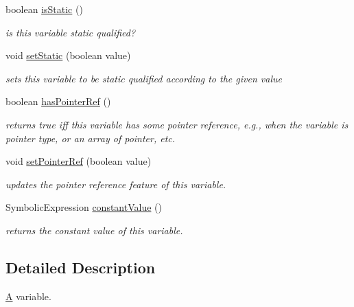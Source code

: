 \begin{DoxyCompactItemize}
\item 
boolean \hyperlink{classedu_1_1udel_1_1cis_1_1vsl_1_1civl_1_1model_1_1common_1_1variable_1_1CommonVariable_ad3a6d561da0a9495e1011d70c77f27e5}{is\+Static} ()
\begin{DoxyCompactList}\small\item\em is this variable static qualified? \end{DoxyCompactList}\item 
void \hyperlink{classedu_1_1udel_1_1cis_1_1vsl_1_1civl_1_1model_1_1common_1_1variable_1_1CommonVariable_abe64d32829988557556abd4056c67526}{set\+Static} (boolean value)
\begin{DoxyCompactList}\small\item\em sets this variable to be static qualified according to the given value \end{DoxyCompactList}\item 
boolean \hyperlink{classedu_1_1udel_1_1cis_1_1vsl_1_1civl_1_1model_1_1common_1_1variable_1_1CommonVariable_a679905d70f87153c5376c6c07711ebaa}{has\+Pointer\+Ref} ()
\begin{DoxyCompactList}\small\item\em returns true iff this variable has some pointer reference, e.\+g., when the variable is pointer type, or an array of pointer, etc. \end{DoxyCompactList}\item 
void \hyperlink{classedu_1_1udel_1_1cis_1_1vsl_1_1civl_1_1model_1_1common_1_1variable_1_1CommonVariable_abd97f2eae43fb74595a83cd7b63382e8}{set\+Pointer\+Ref} (boolean value)
\begin{DoxyCompactList}\small\item\em updates the pointer reference feature of this variable. \end{DoxyCompactList}\item 
Symbolic\+Expression \hyperlink{classedu_1_1udel_1_1cis_1_1vsl_1_1civl_1_1model_1_1common_1_1variable_1_1CommonVariable_adc804a186ec0c828386ac90a1d783159}{constant\+Value} ()
\begin{DoxyCompactList}\small\item\em returns the constant value of this variable. \end{DoxyCompactList}\end{DoxyCompactItemize}


\subsection{Detailed Description}
\hyperlink{structA}{A} variable. 

